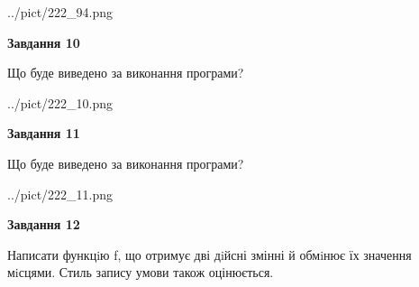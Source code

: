 \documentclass[12pt, ukrainian]{article}
\begin{document}
{\begin {large}
\begin{center}
	{../pict/222_94.png}
\end{center}
\newpage

{\begin {center}\textbf{Завдання 10}\end {center}}

Що буде виведено за виконання програми?\par
\begin{center}
	{../pict/222_10.png}
\end{center}
\newpage

{\begin {center}\textbf{Завдання 11}\end {center}}

Що буде виведено за виконання програми?\par
\begin{center}
	{../pict/222_11.png}
\end{center}
\newpage

{\begin {center}\textbf{Завдання 12}\end {center}}


Написати функцiю f, що отримує дві дiйсні змінні й обмiнює їх значення мiсцями. Стиль запису умови також оцінюється.\par
\newpage

\end {large}}
\end{document}
